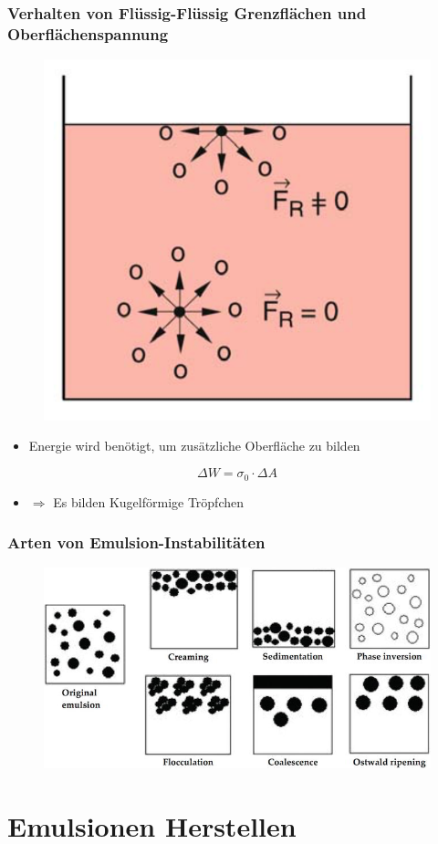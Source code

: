 \documentclass{beamer} %
\begin{document}
\begin{frame}
\frametitle{Verhalten von Flüssig-Flüssig Grenzflächen und Oberflächenspannung}
\begin{figure}
	\centering
	\includegraphics[width=0.3\linewidth]{of.png}
\end{figure}
\pause
\begin{itemize}
	\item{Energie wird benötigt, um zusätzliche Oberfläche zu bilden}
\end{itemize}

\begin{equation}
\Delta W = \sigma_0\cdot \Delta A
\end{equation}
\pause
\begin{itemize}
	\item $\Rightarrow$ Es bilden Kugelförmige Tröpfchen
\end{itemize}
\end{frame}
\begin{frame}
	\frametitle{Arten von Emulsion-Instabilitäten}
\begin{figure}
	\centering
	\includegraphics[width=\linewidth]{F1.png}
\end{figure}
\end{frame}


\section{Emulsionen Herstellen}
\end{document}

